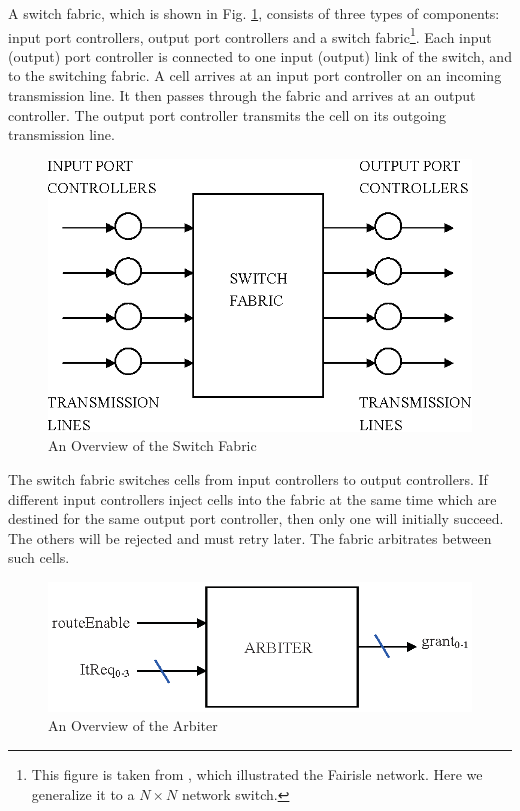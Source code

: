 \documentclass[final]{IEEEtran}
\begin{document}
A switch fabric, which is shown in Fig. \ref{fig:atmSwitch},
consists of three types of components: input port controllers,
output port controllers and a switch fabric\footnote{This figure is
taken from \cite{Paul94}, which illustrated the Fairisle  network.
Here we generalize it to a $N \times N$ network switch.}. Each
input (output) port controller is connected to one input (output)
link of the switch, and to the switching fabric. A cell arrives at
an input port controller on an incoming transmission line. It then
passes through the fabric and arrives at an output controller. The
output port controller transmits the cell on its outgoing
transmission line. %
\begin{figure}[tbph]
\begin{center}
\includegraphics[width=.4\textwidth]{atmSwitch.eps}
\end{center}
\caption{An Overview of the Switch Fabric} \label{fig:atmSwitch}
\end{figure}


The switch fabric switches cells from input controllers to output
controllers. If different input controllers inject cells into the
fabric at the same time which are destined for the same output port
controller, then only one will initially succeed. The others will be
rejected and must retry later. The fabric arbitrates
between such cells.

\begin{figure}[tbph]
\begin{center}
\includegraphics[width=.4\textwidth]{Arbiter.eps}
\end{center}
\caption{An Overview of the Arbiter} \label{fig:arbiter}
\end{figure}
\end{document}
